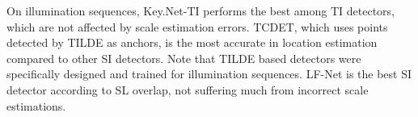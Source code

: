 On illumination sequences, Key.Net-TI performs the best among TI detectors, which are not affected by scale estimation errors. TCDET, which uses points detected by TILDE as anchors, is the most accurate in location estimation compared to other SI detectors. Note that TILDE based detectors were specifically designed and trained for illumination sequences. LF-Net is the best SI detector according to SL overlap, not suffering much from incorrect scale estimations. %

